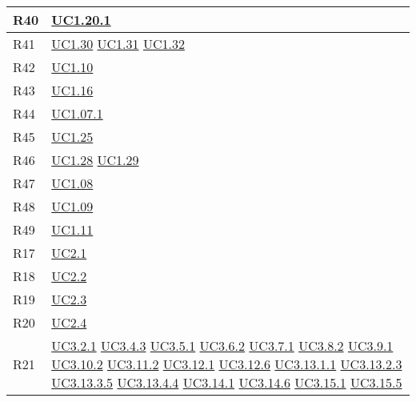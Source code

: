 \begin{longtable}{|P{6cm}|P{6cm}|}
	\hline R40 & \hyperref[UC1.20.1]{UC1.20.1} \\	
	\hline R41 & \hyperref[UC1.30]{UC1.30} \linebreak \hyperref[UC1.31]{UC1.31} \linebreak \hyperref[UC1.32]{UC1.32} \\
	\hline R42 & \hyperref[UC1.10]{UC1.10} \\
	\hline R43 & \hyperref[UC1.16]{UC1.16} \\
	\hline R44 & \hyperref[UC1.07.1]{UC1.07.1} \\
	\hline R45 & \hyperref[UC1.25]{UC1.25} \\
	\hline R46 & \hyperref[UC1.28]{UC1.28} \linebreak \hyperref[UC1.29]{UC1.29}  \\	 
	\hline R47 & \hyperref[UC1.08]{UC1.08} \\
	\hline R48 & \hyperref[UC1.09]{UC1.09} \\
	\hline R49 & \hyperref[UC1.11]{UC1.11} \\	
	\hline R17 & \hyperref[UC2.1]{UC2.1} \\
	\hline R18 & \hyperref[UC2.2]{UC2.2} \\
	\hline R19 & \hyperref[UC2.3]{UC2.3} \\
	\hline R20 & \hyperref[UC2.4]{UC2.4} \\	
	\hline R21 & \hyperref[UC3.2.1]{UC3.2.1} \linebreak \hyperref[UC3.4.3]{UC3.4.3} \linebreak \hyperref[UC3.5.1]{UC3.5.1} \linebreak \hyperref[UC3.6.2]{UC3.6.2} \linebreak \hyperref[UC3.7.1]{UC3.7.1} \linebreak \hyperref[UC3.8.2]{UC3.8.2} \linebreak \hyperref[UC3.9.1]{UC3.9.1} \linebreak \hyperref[UC3.10.2]{UC3.10.2} \linebreak \hyperref[UC3.11.2]{UC3.11.2} \linebreak  \hyperref[UC3.12.1]{UC3.12.1} \linebreak \hyperref[UC3.12.6]{UC3.12.6} \linebreak  \hyperref[UC3.13.1.1]{UC3.13.1.1} \linebreak \hyperref[UC3.13.2.3]{UC3.13.2.3} \linebreak \hyperref[UC3.13.3.5]{UC3.13.3.5} \linebreak \hyperref[UC3.13.4.4]{UC3.13.4.4} \linebreak \hyperref[UC3.14.1]{UC3.14.1} \linebreak \hyperref[UC3.14.6]{UC3.14.6} \linebreak \hyperref[UC3.15.1]{UC3.15.1} \linebreak \hyperref[UC3.15.5]{UC3.15.5} \\

\end{longtable}
